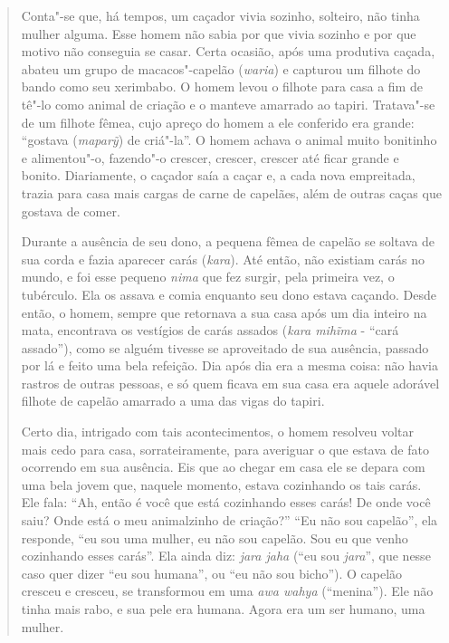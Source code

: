 \begin{quote}
Conta"-se que, há tempos, um caçador vivia sozinho, solteiro, não tinha
mulher alguma. Esse homem não sabia por que vivia sozinho e por que
motivo não conseguia se casar. Certa ocasião, após uma produtiva caçada,
abateu um grupo de macacos"-capelão (\emph{waria}) e capturou um filhote
do bando como seu xerimbabo. O homem levou o filhote para casa a fim de
tê"-lo como animal de criação e o manteve amarrado ao tapiri. Tratava"-se
de um filhote fêmea, cujo apreço do homem a ele conferido era grande:
``gostava (\emph{maparỹ}) de criá"-la''. O homem achava o animal muito
bonitinho e alimentou"-o, fazendo"-o crescer, crescer, crescer até ficar
grande e bonito. Diariamente, o caçador saía a caçar e, a cada nova
empreitada, trazia para casa mais cargas de carne de capelães, além de
outras caças que gostava de comer.

Durante a ausência de seu dono, a pequena fêmea de capelão se soltava de
sua corda e fazia aparecer carás (\emph{kara}). Até então, não existiam
carás no mundo, e foi esse pequeno \emph{nima} que fez surgir, pela
primeira vez, o tubérculo. Ela os assava e comia enquanto seu dono
estava caçando. Desde então, o homem, sempre que retornava a sua casa
após um dia inteiro na mata, encontrava os vestígios de carás assados
(\emph{kara mihĩma} - ``cará assado''), como se alguém tivesse se
aproveitado de sua ausência, passado por lá e feito uma bela refeição.
Dia após dia era a mesma coisa: não havia rastros de outras pessoas, e
só quem ficava em sua casa era aquele adorável filhote de capelão
amarrado a uma das vigas do tapiri.

Certo dia, intrigado com tais acontecimentos, o homem resolveu voltar
mais cedo para casa, sorrateiramente, para averiguar o que estava de
fato ocorrendo em sua ausência. Eis que ao chegar em casa ele se depara
com uma bela jovem que, naquele momento, estava cozinhando os tais
carás. Ele fala: ``Ah, então é você que está cozinhando esses carás! De
onde você saiu? Onde está o meu animalzinho de criação?'' ``Eu não sou
capelão'', ela responde, ``eu sou uma mulher, eu não sou capelão. Sou eu
que venho cozinhando esses carás''. Ela ainda diz: \emph{jara jaha} (``eu
sou \emph{jara}'', que nesse caso quer dizer ``eu sou humana'', ou ``eu não
sou bicho''). O capelão cresceu e cresceu, se transformou em uma
\emph{awa wahya} (``menina''). Ele não tinha mais rabo, e sua pele era
humana. Agora era um ser humano, uma mulher.
\end{quote}

